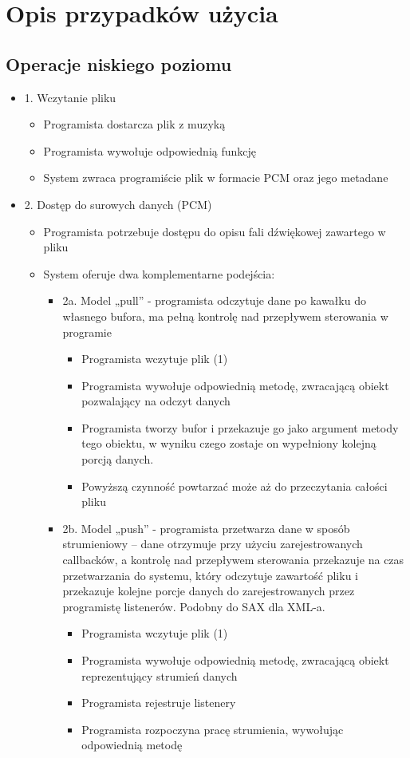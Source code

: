 \section{Opis przypadków użycia}
\subsection{Operacje niskiego poziomu}
\begin{itemize}
	\item 1. Wczytanie pliku
	\begin{itemize}
		\item Programista dostarcza plik z muzyką
		\item Programista wywołuje odpowiednią funkcję
		\item System zwraca programiście plik w formacie PCM oraz jego metadane
	\end{itemize}
	\item 2. Dostęp do surowych danych (PCM)
	\begin{itemize}
		\item Programista potrzebuje dostępu do opisu fali dźwiękowej zawartego w pliku
		\item System oferuje dwa komplementarne podejścia:
		\begin{itemize}
			\item 2a. Model „pull” - programista odczytuje dane po kawałku do własnego bufora, ma pełną kontrolę nad przepływem sterowania w programie
			\begin{itemize}
				\item Programista wczytuje plik (1)
				\item Programista wywołuje odpowiednią metodę, zwracającą obiekt pozwalający na odczyt danych
				\item Programista tworzy bufor i przekazuje go jako argument metody tego obiektu, w wyniku czego zostaje on wypełniony kolejną porcją danych.
				\item Powyższą czynność powtarzać może aż do przeczytania całości pliku
			\end{itemize}
			\item 2b. Model „push” - programista przetwarza dane w sposób strumieniowy – dane otrzymuje przy użyciu zarejestrowanych callbacków, a kontrolę nad przepływem sterowania przekazuje na czas przetwarzania do systemu, który odczytuje zawartość pliku i przekazuje kolejne porcje danych do zarejestrowanych przez programistę listenerów. Podobny do SAX dla XML-a.
			\begin{itemize}
				\item Programista wczytuje plik (1)
				\item Programista wywołuje odpowiednią metodę, zwracającą obiekt reprezentujący strumień danych
				\item Programista rejestruje listenery
				\item Programista rozpoczyna pracę strumienia, wywołując odpowiednią metodę
			\end{itemize}
		\end{itemize}
	\end{itemize}
\end{itemize}

